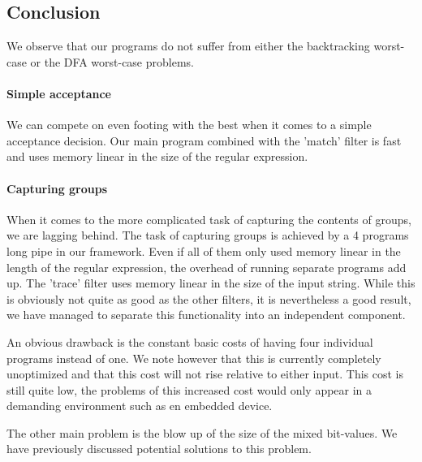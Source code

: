 \subsection{Conclusion}

We observe that our programs do not suffer from either the
backtracking worst-case or the DFA worst-case problems.

\paragraph{Simple acceptance} We can compete on even footing with the
best when it comes to a simple acceptance decision. Our main program
combined with the 'match' filter is fast and uses memory linear in the
size of the regular expression.

\paragraph{Capturing groups} When it comes to the more complicated
task of capturing the contents of groups, we are lagging behind. The
task of capturing groups is achieved by a 4 programs long pipe in our
framework. Even if all of them only used memory linear in the length
of the regular expression, the overhead of running separate programs
add up.  The 'trace' filter uses memory linear in the size of the
input string. While this is obviously not quite as good as the other
filters, it is nevertheless a good result, we have managed to separate
this functionality into an independent component.

An obvious drawback is the constant basic costs of having four
individual programs instead of one. We note however that this is
currently completely unoptimized and that this cost will not rise
relative to either input. This cost is still quite low, the problems
of this increased cost would only appear in a demanding environment
such as en embedded device.

The other main problem is the blow up of the size of the mixed
bit-values. We have previously discussed potential solutions to this
problem.


